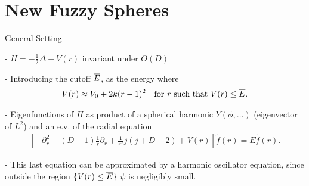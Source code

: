 \section{New Fuzzy Spheres}

\begin{frame}{General Setting} %
    
    - $H = - \frac{1}{2} \Delta + V(r)$ invariant under $O(D)$
    
    - Introducing the cutoff $\overline{E}$, as the energy where
    \begin{align}
        \label{eqn5}
            V(r) \approx V_0 + 2k(r-1)^2 && \text{for $r$ such that $V(r) \leq  \overline{E}$}.
    \end{align}
    
    - Eigenfunctions of $H$ as product of a spherical harmonic $Y(\phi, \dots)$ (eigenvector of $L^2$) and an e.v. of the radial equation 
    \begin{align}
        \label{eqn9}
        \left[-\partial_r^2 - (D-1) \frac{1}{r} \partial_r + \frac{1}{r^2} j(j+D-2) + V(r)\right] \tilde f(r) = E \tilde f(r).
    \end{align}
    
    - This last equation can be approximated by a harmonic oscillator equation, since outside the region $\{V(r) \leq \overline{E}\}$ $\psi$ is negligibly small.
        
    
    
    
    
\end{frame}



